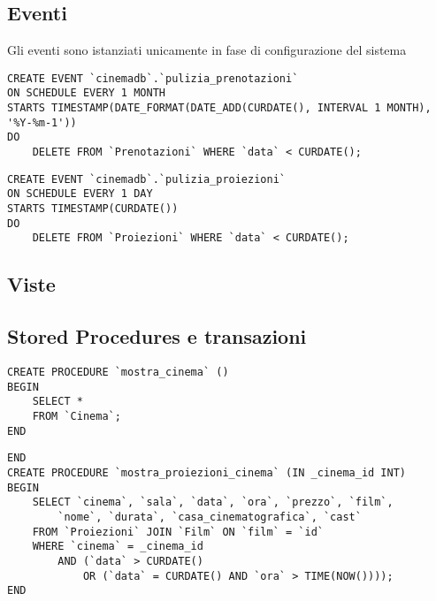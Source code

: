 \pagebreak
\subsection*{Eventi}
%
%

Gli eventi sono istanziati unicamente in fase di configurazione del sistema

\begin{verbatim}
CREATE EVENT `cinemadb`.`pulizia_prenotazioni`
ON SCHEDULE EVERY 1 MONTH
STARTS TIMESTAMP(DATE_FORMAT(DATE_ADD(CURDATE(), INTERVAL 1 MONTH), '%Y-%m-1'))
DO
    DELETE FROM `Prenotazioni` WHERE `data` < CURDATE();
\end{verbatim}

\begin{verbatim}
CREATE EVENT `cinemadb`.`pulizia_proiezioni`
ON SCHEDULE EVERY 1 DAY
STARTS TIMESTAMP(CURDATE())
DO
    DELETE FROM `Proiezioni` WHERE `data` < CURDATE();
\end{verbatim}

\subsection*{Viste}
%
%

\pagebreak
\subsection*{Stored Procedures e transazioni}
%
%

\begin{verbatim}
CREATE PROCEDURE `mostra_cinema` ()
BEGIN
    SELECT *
    FROM `Cinema`;
END
\end{verbatim}

\begin{verbatim}
END
CREATE PROCEDURE `mostra_proiezioni_cinema` (IN _cinema_id INT)
BEGIN
    SELECT `cinema`, `sala`, `data`, `ora`, `prezzo`, `film`,
        `nome`, `durata`, `casa_cinematografica`, `cast`
    FROM `Proiezioni` JOIN `Film` ON `film` = `id`
    WHERE `cinema` = _cinema_id
        AND (`data` > CURDATE()
            OR (`data` = CURDATE() AND `ora` > TIME(NOW())));
END
\end{verbatim}

